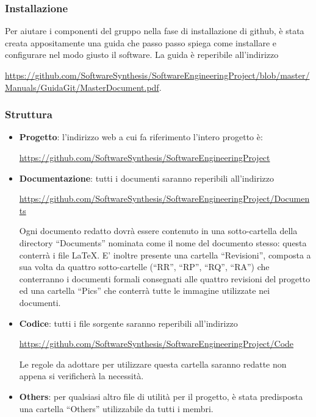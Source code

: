 \subsubsection{Installazione}
Per aiutare i componenti del gruppo nella fase di installazione di github, è stata creata appositamente una guida che passo passo spiega come installare e configurare nel modo giusto il software. La guida è reperibile all'indirizzo
\begin{center}
\url{https://github.com/SoftwareSynthesis/SoftwareEngineeringProject/blob/master/Manuals/GuidaGit/MasterDocument.pdf}.
\end{center}

\subsubsection{Struttura}
\label{sec:struttura}
\begin{itemize}
\item \textbf{Progetto}: l'indirizzo web a cui fa riferimento l'intero progetto è: 
\begin{center}
\url{https://github.com/SoftwareSynthesis/SoftwareEngineeringProject}
\end{center} 
\item \textbf{Documentazione}: tutti i documenti saranno reperibili all'indirizzo
\begin{center}
\url{https://github.com/SoftwareSynthesis/SoftwareEngineeringProject/Documents}
\end{center}
Ogni documento redatto dovrà essere contenuto in una sotto-cartella della directory ``Documents'' nominata come il nome del documento stesso: questa conterrà i file \LaTeX. E' inoltre presente una cartella ``Revisioni'', composta a sua volta da quattro sotto-cartelle (``RR'', ``RP'', ``RQ'', ``RA'') che conterranno i documenti formali consegnati alle quattro revisioni del progetto ed una cartella ``Pics'' che conterrà tutte le immagine utilizzate nei documenti.
\item \textbf{Codice}: tutti i file sorgente saranno reperibili all'indirizzo
\begin{center}
\url{https://github.com/SoftwareSynthesis/SoftwareEngineeringProject/Code}
\end{center}
Le regole da adottare per utilizzare questa cartella saranno redatte non appena si verificherà la necessità.
\item \textbf{Others}: per qualsiasi altro file di utilità per il progetto, è stata predisposta una cartella ``Others'' utilizzabile da tutti i membri.
\end{itemize}

